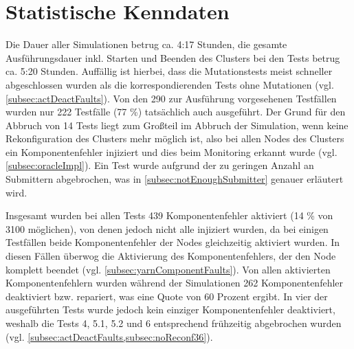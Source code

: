 \section{Statistische Kenndaten}
\label{sec:evaluationStats}

Die Dauer aller Simulationen betrug ca. 4:17 Stunden, die gesamte Ausführungsdauer inkl. Starten und Beenden des Clusters bei den Tests betrug ca. 5:20 Stunden.
Auffällig ist hierbei, dass die Mutationstests meist schneller abgeschlossen wurden als die korrespondierenden Tests ohne Mutationen (vgl. \cref{subsec:actDeactFaults}).
Von den 290 zur Ausführung vorgesehenen Testfällen wurden nur 222 Testfälle (77 \%) tatsächlich auch ausgeführt.
Der Grund für den Abbruch von 14 Tests liegt zum Großteil im Abbruch der Simulation, wenn keine Rekonfiguration des Clusters mehr möglich ist, also bei allen Nodes des Clusters ein Komponentenfehler injiziert und dies beim Monitoring erkannt wurde (vgl. \cref{subsec:oracleImpl}).
Ein Test wurde aufgrund der zu geringen Anzahl an Submittern abgebrochen, was in \cref{subsec:notEnoughSubmitter} genauer erläutert wird.

Insgesamt wurden bei allen Tests 439 Komponentenfehler aktiviert (14 \% von 3100 möglichen), von denen jedoch nicht alle injiziert wurden, da bei einigen Testfällen beide Komponentenfehler der Nodes gleichzeitig aktiviert wurden.
In diesen Fällen überwog die Aktivierung des Komponentenfehlers, der den Node komplett beendet (vgl.  \cref{subsec:yarnComponentFaults}).
Von allen aktivierten Komponentenfehlern wurden während der Simulationen 262 Komponentenfehler deaktiviert bzw. repariert, was eine Quote von 60 Prozent ergibt.
In vier der ausgeführten Tests wurde jedoch kein einziger Komponentenfehler deaktiviert, weshalb die Tests 4, 5.1, 5.2 und 6 entsprechend frühzeitig abgebrochen wurden (vgl. \cref{subsec:actDeactFaults,subsec:noReconf36}).

